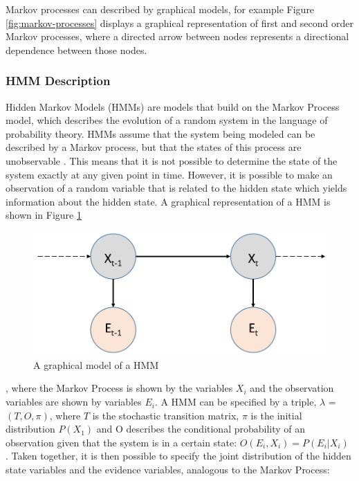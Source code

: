 Markov processes can described by graphical models, for example Figure \ref{fig:markov-processes} displays a graphical representation of first and second order Markov processes, where a directed arrow between nodes represents a directional dependence between those nodes.

\subsubsection{HMM Description}\label{subsubsec:HMMDesc}
Hidden Markov Models (HMMs) are models that build on the Markov Process model, which describes the evolution of a random system in the language of probability theory. HMMs assume that the system being modeled can be described by a Markov process, but that the states of this process are unobservable \cite{Ghahramani2001AnNetworks}. This means that it is not possible to determine the state of the system exactly at any given point in time. However, it is possible to make an observation of a random variable that is related to the hidden state which yields information about the hidden state. A graphical representation of a HMM is shown in Figure \ref{fig:hmm}
\begin{figure}[]
    \centering
    \includegraphics[width=0.8\linewidth]{Chapters/BackgroundKnowledgeAndRelatedWork/MultiAgentTargetDetectionBackground/Figs/HMMs/HMMGraphicalModel.png}
    \caption{A graphical model of a HMM}
    \label{fig:hmm}
\end{figure}
, where the Markov Process is shown by the variables $X_i$ and the observation variables are shown by variables $E_i$. A HMM can be specified by a triple, $\lambda$ = $(T, O, \pi)$, where $T$ is the stochastic transition matrix, $\pi$ is the initial distribution $P(X_1)$ and O describes the conditional probability of an observation given that the system is in a certain state: $O(E_i, X_i) = P(E_{i} | X_{i})$ \cite{Rabiner1989ARecognition}. Taken together, it is then possible to specify the joint distribution of the hidden state variables and the evidence variables, analogous to the Markov Process: 
